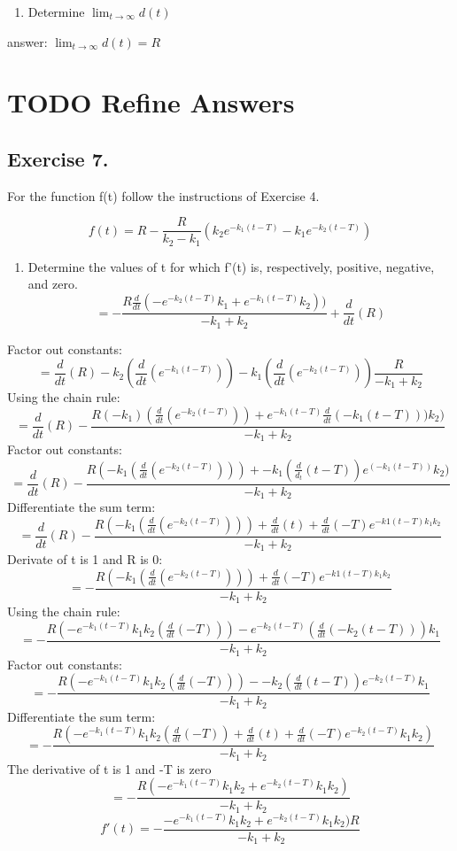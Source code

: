\documentclass[]{article}
\providecommand{\tightlist}{%
  \setlength{\itemsep}{0pt}\setlength{\parskip}{0pt}}
\begin{document}
\begin{enumerate}
\def\labelenumi{(\alph{enumi})}
\setcounter{enumi}{2}
\tightlist
\item
  Determine \(\lim_{t\to\infty}d(t)\)
\end{enumerate}

answer: \(\lim_{t\to\infty}d(t) =R\)

\section{TODO Refine Answers}\label{todo-refine-answers-1}

\subsection{Exercise 7.}\label{exercise-7.}

For the function f(t) follow the instructions of Exercise 4.

\[f(t) = R - \frac{R}{k_2 - k_1}(k_2 e^{-k_1(t-T)}-k_1 e^{-k_2(t-T)})\]

\begin{enumerate}
\def\labelenumi{(\alph{enumi})}
\tightlist
\item
  Determine the values of t for which f'(t) is, respectively, positive,
  negative, and zero.
  \[=- \frac{R \frac{d}{dt}(-e^{-k_2 (t-T)}k_1 + e^{-k_1(t - T)}k_2))}{-k_1 + k_2} + \frac{d}{dt}(R)\]
\end{enumerate}

Factor out constants:
\[=\frac{d}{dt}(R) - k_2(\frac{d}{dt}(e^{-k_1(t - T)})) - k_1 (\frac{d}{dt}(e^{-k_2(t-T)})) \frac{R}{-k_1 + k_2}\]
Using the chain rule:
\[=\frac{d}{dt}(R)-\frac{R(-k_1)(\frac{d}{dt}(e^{-k_2(t-T)})) + e^{-k_1(t-T)}\frac{d}{dt}(-k_1(t-T)))k_2)}{-k_1+ k_2}\]
Factor out constants:
\[=\frac{d}{dt}(R) - \frac{R(-k_1(\frac{d}{dt}(e^{-k_2(t-T)})))+-k_1(\frac{d}{d_t}(t-T))e^(-k_1(t-T))k_2)}{-k_1 + k_2}\]
Differentiate the sum term:
\[=\frac{d}{dt}(R) - \frac{R(-k_1(\frac{d}{dt}(e^{-k_2(t-T)})))+ \frac{d}{dt}(t) + \frac{d}{dt}(-T)e^{-k1(t-T)k_1 k_2}}{-k_1 + k_2}\]
Derivate of t is 1 and R is 0:
\[=- \frac{R(-k_1(\frac{d}{dt}(e^{-k_2(t-T)})))+ \frac{d}{dt}(-T)e^{-k1(t-T)k_1 k_2}}{-k_1 + k_2}\]
Using the chain rule:
\[=-\frac{R(-e^{-k_1 (t-T)}k_1 k_2(\frac{d}{dt}(-T)))- e^{-k_2(t-T)}(\frac{d}{dt}(-k_2(t-T)))k_1}{-k_1 + k_2}\]
Factor out constants:
\[=-\frac{R(-e^{-k_1 (t-T)}k_1 k_2(\frac{d}{dt}(-T)))- -k_2(\frac{d}{dt}(t-T))e^{-k_2 (t-T)}k_1}{-k_1 + k_2}\]
Differentiate the sum term:
\[=-\frac{R(-e^{-k_1(t-T)}k_1 k_2(\frac{d}{dt}(-T)) + \frac{d}{dt}(t)+\frac{d}{dt}(-T)e^{-k_2(t-T)}k_1 k_2)}{-k_1 + k_2}\]
The derivative of t is 1 and -T is zero
\[=-\frac{R(-e^{-k_1(t-T)}k_1 k_2 + e^{-k_2(t-T)}k_1 k_2)}{-k_1 + k_2}\]
\[f'(t)=-\frac{-e^{-k_1 (t -T)}k_1 k_2 + e^{-k_2(t-T)}k_1 k_2)R}{-k_1 + k_2}\]
\end{document}

